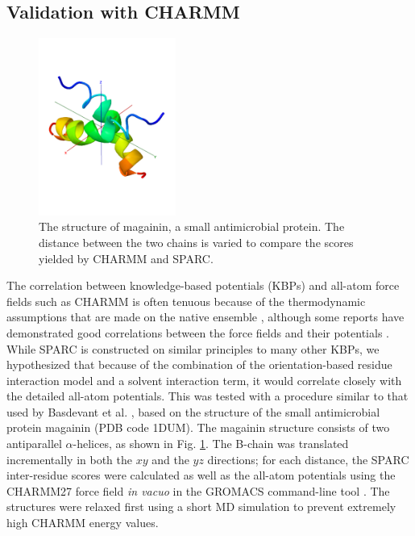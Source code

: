 \documentclass[11pt,titlepage]{article}
\begin{document}
\subsection{Validation with CHARMM}

\begin{figure}
	\includegraphics[trim={0 5cm 0 5cm}, clip=true, width=0.4\textwidth]{magainin_structure}
	\caption{The structure of magainin, a small antimicrobial protein. The distance between the two chains is varied to compare the scores yielded by CHARMM and SPARC.}
	\label{magainin}
\end{figure}

The correlation between knowledge-based potentials (KBPs) and all-atom force fields such as CHARMM is often tenuous because of the thermodynamic assumptions that are made on the native ensemble \cite{mullinax}, although some reports have demonstrated good correlations between the force fields and their potentials \cite{mohanty,basdevant}.
While SPARC is constructed on similar principles to many other KBPs, we hypothesized that because of the combination of the orientation-based residue interaction model and a solvent interaction term, it would correlate closely with the detailed all-atom potentials.
This was tested with a procedure similar to that used by Basdevant et al. \cite{basdevant}, based on the structure of the small antimicrobial protein magainin (PDB code 1DUM).
The magainin structure consists of two antiparallel $\alpha$-helices, as shown in Fig. \ref{magainin}.
The B-chain was translated incrementally in both the $xy$ and the $yz$ directions; for each distance, the SPARC inter-residue scores were calculated as well as the all-atom potentials using the CHARMM27 force field \textit{in vacuo} in the GROMACS command-line tool \cite{gromacs}.
The structures were relaxed first using a short MD simulation to prevent extremely high CHARMM energy values.
\end{document}
